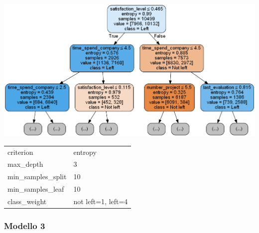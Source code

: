 \documentclass[a4paper]{article}
\begin{document}
\noindent \begin{minipage}{\textwidth}

  \begin{minipage}[b]{0.65\textwidth}
    \centering
    
    \includegraphics[width=\textwidth]{albero3}
  \end{minipage}
  \hfill
  \begin{minipage}[b]{0.3\textwidth}
    \centering
    \setlength{\tabcolsep}{10pt} %
\renewcommand{\arraystretch}{1.5} %
    \begin{tabularx}{\textwidth}{|lX|}
	\hline
	criterion                & entropy      \\
	max\_depth               & 3         \\
	min\_samples\_split      & 10         \\
	min\_samples\_leaf       & 10         \\
	class\_weight            & not left=1, left=4     \\\hline
	\end{tabularx}
      \label{img:model2}
    \end{minipage}
  \end{minipage}
  
\subsubsection*{Modello 3}
  
\end{document}
